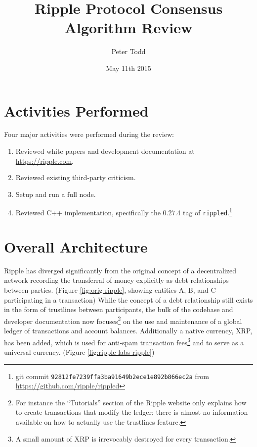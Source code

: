 \documentclass{article}
\begin{document}
\title{Ripple Protocol Consensus Algorithm Review}
\author{Peter Todd}
\date{May 11th 2015}
\maketitle

\section{Activities Performed}

Four major activities were performed during the review:

\begin{enumerate}

    \item Reviewed white papers and development documentation at \url{https://ripple.com}.

    \item Reviewed existing third-party criticism.

    \item Setup and run a full node.

    \item Reviewed C++ implementation, specifically the 0.27.4 tag of
        \texttt{rippled}.\footnote{git commit
    \texttt{92812fe7239ffa3ba91649b2ece1e892b866ec2a} from \url{https://github.com/ripple/rippled}}

\end{enumerate}


\section{Overall Architecture}

Ripple has diverged significantly from the original
concept\cite{btcmag-introducing-ripple} of a decentralized network recording
the transferral of money explicitly as debt relationships between parties.
(Figure \ref{fig:orig-ripple}, showing entities A, B, and C participating in a
transaction) While the concept of a debt relationship still exists in the form
of trustlines between participants, the bulk of the codebase and developer
documentation now focuses\footnote{For instance the ``Tutorials'' section of
the Ripple website only explains how to create transactions that modify the
ledger; there is almost no information available on how to actually use the
trustlines feature.} on the use and maintenance of a global ledger of
transactions and account balances.  Additionally a native currency, XRP, has
been added, which is used for anti-spam transaction fees\footnote{A small
amount of XRP is irrevocably destroyed for every transaction.} and to
serve as a universal currency. (Figure \ref{fig:ripple-labs-ripple})
\end{document}
